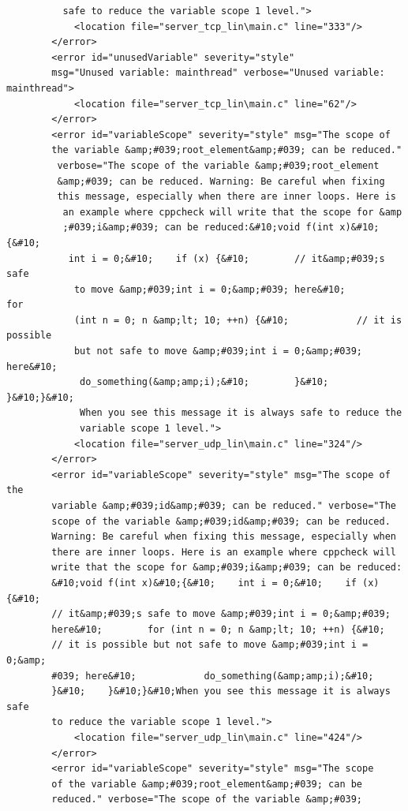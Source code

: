 \documentclass[10pt,a4paper]{report}
\begin{document}
\begin{lstlisting}
          safe to reduce the variable scope 1 level.">
            <location file="server_tcp_lin\main.c" line="333"/>
        </error>
        <error id="unusedVariable" severity="style" 
        msg="Unused variable: mainthread" verbose="Unused variable: mainthread">
            <location file="server_tcp_lin\main.c" line="62"/>
        </error>
        <error id="variableScope" severity="style" msg="The scope of 
        the variable &amp;#039;root_element&amp;#039; can be reduced."
         verbose="The scope of the variable &amp;#039;root_element
         &amp;#039; can be reduced. Warning: Be careful when fixing 
         this message, especially when there are inner loops. Here is
          an example where cppcheck will write that the scope for &amp
          ;#039;i&amp;#039; can be reduced:&#10;void f(int x)&#10;{&#10;   
           int i = 0;&#10;    if (x) {&#10;        // it&amp;#039;s safe
            to move &amp;#039;int i = 0;&amp;#039; here&#10;        for 
            (int n = 0; n &amp;lt; 10; ++n) {&#10;            // it is possible 
            but not safe to move &amp;#039;int i = 0;&amp;#039; here&#10;           
             do_something(&amp;amp;i);&#10;        }&#10;    }&#10;}&#10;
             When you see this message it is always safe to reduce the 
             variable scope 1 level.">
            <location file="server_udp_lin\main.c" line="324"/>
        </error>
        <error id="variableScope" severity="style" msg="The scope of the 
        variable &amp;#039;id&amp;#039; can be reduced." verbose="The 
        scope of the variable &amp;#039;id&amp;#039; can be reduced. 
        Warning: Be careful when fixing this message, especially when 
        there are inner loops. Here is an example where cppcheck will 
        write that the scope for &amp;#039;i&amp;#039; can be reduced:
        &#10;void f(int x)&#10;{&#10;    int i = 0;&#10;    if (x) {&#10;        
        // it&amp;#039;s safe to move &amp;#039;int i = 0;&amp;#039; 
        here&#10;        for (int n = 0; n &amp;lt; 10; ++n) {&#10;            
        // it is possible but not safe to move &amp;#039;int i = 0;&amp;
        #039; here&#10;            do_something(&amp;amp;i);&#10;        
        }&#10;    }&#10;}&#10;When you see this message it is always safe 
        to reduce the variable scope 1 level.">
            <location file="server_udp_lin\main.c" line="424"/>
        </error>
        <error id="variableScope" severity="style" msg="The scope 
        of the variable &amp;#039;root_element&amp;#039; can be 
        reduced." verbose="The scope of the variable &amp;#039;

\end{lstlisting}
\end{document}
